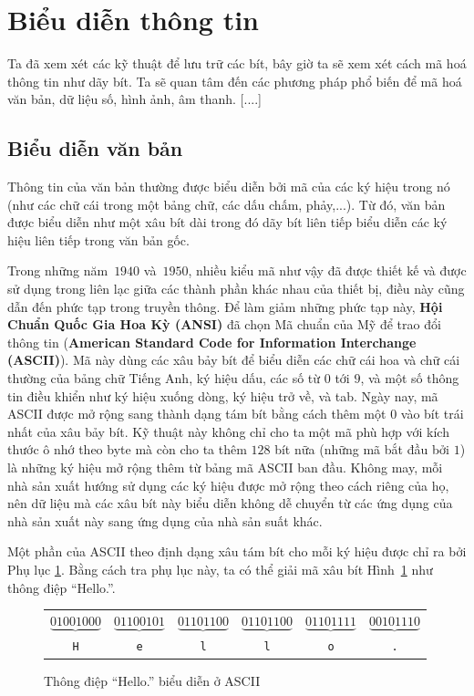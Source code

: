 
\section{Biểu diễn thông tin}

Ta đã xem xét các kỹ thuật để lưu trữ các bít, bây giờ ta sẽ xem xét cách mã hoá thông tin
như dãy bít. Ta sẽ quan tâm đến các phương pháp phổ biến để mã hoá văn bản, dữ liệu số,
hình ảnh, âm thanh. [....]

\subsection*{Biểu diễn văn bản}
Thông tin của văn bản thường được biểu diễn bởi mã của các ký hiệu trong nó (như các chữ
cái trong một bảng chữ, các dấu chấm, phảy,...). Từ đó, văn bản được biểu diễn như một xâu
bít dài trong đó dãy bít liên tiếp biểu diễn các ký hiệu liên tiếp trong văn bản gốc.

Trong những năm~$1940$ và~$1950$, nhiều kiểu mã như vậy đã được thiết kế và được sử dụng
trong liên lạc giữa các thành phần khác nhau của thiết bị, điều này cũng dẫn đến phức tạp
trong truyền thông. Để làm giảm những phức tạp này, \textbf{Hội Chuẩn Quốc Gia Hoa Kỳ
  (ANSI)} đã chọn Mã chuẩn của Mỹ để trao đổi thông tin (\textbf{American Standard Code
  for Information Interchange (ASCII)}). Mã này dùng các xâu bảy bít để biểu diễn các chữ
cái hoa và chữ cái thường của bảng chữ Tiếng Anh, ký hiệu dấu, các số từ $0$ tới $9$, và
một số thông tin điều khiển như ký hiệu xuống dòng, ký hiệu trở về, và tab. Ngày nay, mã
ASCII được mở rộng sang thành dạng tám bít bằng cách thêm một $0$ vào bít trái nhất của
xâu bảy bít. Kỹ thuật này không chỉ cho ta một mã phù hợp với kích thước ô nhớ theo byte
mà còn cho ta thêm $128$ bít nữa (những mã bắt đầu bởi $1$) là những ký hiệu mở rộng thêm
từ bảng mã ASCII ban đầu. Không may, mỗi nhà sản xuất hướng sử dụng các ký hiệu được mở
rộng theo cách riêng của họ, nên dữ liệu mà các xâu bít này biểu diễn không dễ chuyển từ
các ứng dụng của nhà sản xuất này sang ứng dụng của nhà sản suất khác.

Một phần của ASCII theo định dạng xâu tám bít cho mỗi ký hiệu được chỉ ra bởi Phụ lục
\ref{}. Bằng cách tra phụ lục này, ta có thể giải mã xâu bít Hình~\ref{fig:fig1.13}
như thông điệp ``Hello.''.

\begin{figure}[bt]
\centering
\begin{tabular}{cccccc}
  $\underbrace{01001000}$ & $\underbrace{01100101}$
  & $\underbrace{01101100}$ & $\underbrace{01101100}$  
  & $\underbrace{01101111}$ & $\underbrace{00101110}$ \\
  \texttt{H}  & \texttt{e}  & \texttt{l} & \texttt{l} & \texttt{o}
  & \texttt{.}                                        \\
\end{tabular}
\caption{Thông điệp ``Hello.'' biểu diễn ở ASCII}
  \label{fig:fig1.13}
\end{figure}


